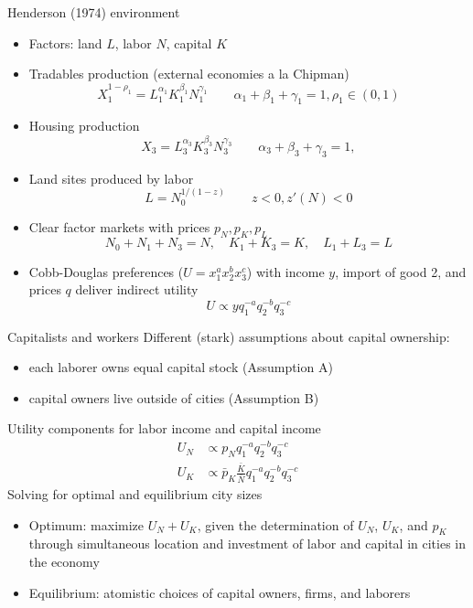 \documentclass[10pt,notes=hide]{beamer}
\begin{document}
\begin{frame}{Henderson (1974) environment}
\begin{itemize}
\item Factors: land $L$, labor $N$, capital $K$
\item Tradables production (external economies a la Chipman)
\begin{equation*}
    X_1^{1-\rho_1} = L_{1}^{\alpha_1} K_{1}^{\beta_1} N_{1}^{\gamma_1}
    \qquad
    \alpha_1 + \beta_1 + \gamma_1 = 1,
    \rho_1\in(0,1)
\end{equation*}
\item Housing production
\begin{equation*}
    X_3 = L_{3}^{\alpha_3} K_{3}^{\beta_3} N_{3}^{\gamma_3}
    \qquad
    \alpha_3 + \beta_3 + \gamma_3 = 1,
\end{equation*}
\item Land sites produced by labor
\begin{equation*}
    L =  N_0^{1/(1-z)}
    \qquad
    z < 0, z'(N)<0
\end{equation*}
\item Clear factor markets with prices $p_N, p_K, p_L$
\begin{equation*}
    N_0 + N_1 + N_3  = N , \quad
    K_1 + K_3  = K , \quad
    L_1 + L_3  = L 
\end{equation*}
\item Cobb-Douglas preferences ($U=x_1^a x_2^b x_3^c$) with income $y$, import of good 2, and prices $q$ deliver indirect utility
\begin{equation*}
    U \propto y q_1^{-a} q_2^{-b} q_3^{-c}
\end{equation*}
\end{itemize}
\end{frame}
\begin{frame}{Capitalists and workers}
Different (stark) assumptions about capital ownership: 
\begin{itemize}
\item each laborer owns equal capital stock (Assumption A)
\item capital owners live outside of cities (Assumption B)
\end{itemize}
Utility components for labor income and capital income
\begin{align*}
U_N &
\propto p_N q_1^{-a} q_2^{-b} q_3^{-c}
\\
U_K &
\propto \bar{p}_K \frac{\bar{K}}{\bar{N}} q_1^{-a} q_2^{-b} q_3^{-c}
\end{align*}
Solving for optimal and equilibrium city sizes
\begin{itemize}
    \item Optimum: maximize $U_N + U_K$, given the determination of $U_N$, $U_K$, and $p_K$ through simultaneous location and investment of labor and capital in cities in the economy 
    \item Equilibrium: atomistic choices of capital owners, firms, and laborers
\end{itemize}
\end{frame}
\end{document}
